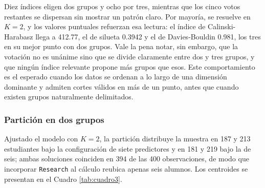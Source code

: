 \documentclass[
  10pt,
  a4paper]{article}
\begin{document}
\begin{table}[!h]
\centering
\caption{\label{tab:cuadro2}Distribución de votos de los índices de validación interna evaluados por NbClust.}
\centering
{}
\end{table}

Diez índices eligen dos grupos y ocho por tres, mientras que los cinco votos restantes se dispersan sin mostrar un patrón claro. Por mayoría, se resuelve en \(K = 2\), y los valores puntuales refuerzan esa lectura: el índice de Calinski-Harabasz llega a 412.77, el de silueta 0.3942 y el de Davies-Bouldin 0.981, los tres en su mejor punto con dos grupos. Vale la pena notar, sin embargo, que la votación no es unánime sino que se divide claramente entre dos y tres grupos, y que ningún índice relevante propone más grupos que esos. Este comportamiento es el esperado cuando los datos se ordenan a lo largo de una dimensión dominante y admiten cortes válidos en más de un punto, antes que cuando existen grupos naturalmente delimitados.

\subsubsection{Partición en dos grupos}\label{particiuxf3n-en-dos-grupos}

Ajustado el modelo con \(K = 2\), la partición distribuye la muestra en 187 y 213 estudiantes bajo la configuración de siete predictores y en 181 y 219 bajo la de seis; ambas soluciones coinciden en 394 de las 400 observaciones, de modo que incorporar \texttt{Research} al cálculo reubica apenas seis alumnos. Los centroides se presentan en el Cuadro \ref{tab:cuadro3}.

\vspace{0.3cm}
\end{document}
